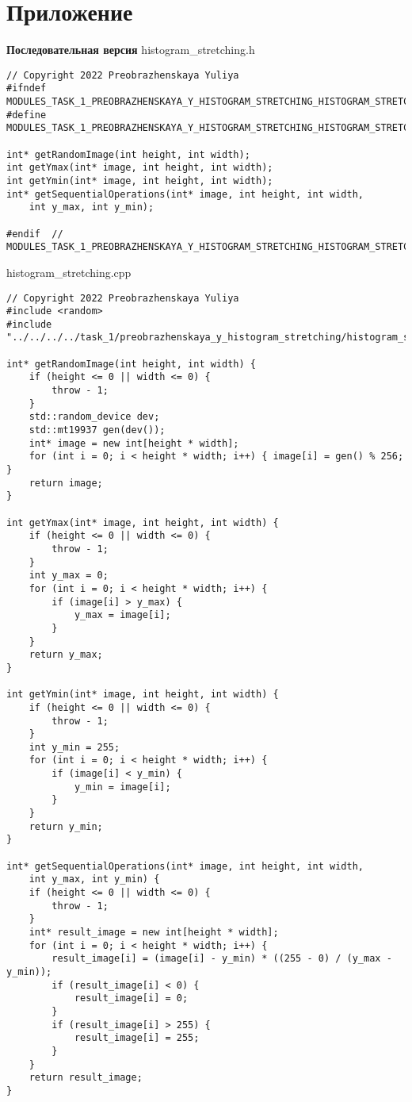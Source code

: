 \documentclass{report}
\begin{document}
\section*{Приложение}
\textbf{Последовательная версия}
\newline
\newline histogram\_stretching.h
\begin{lstlisting}
// Copyright 2022 Preobrazhenskaya Yuliya
#ifndef MODULES_TASK_1_PREOBRAZHENSKAYA_Y_HISTOGRAM_STRETCHING_HISTOGRAM_STRETCHING_H_
#define MODULES_TASK_1_PREOBRAZHENSKAYA_Y_HISTOGRAM_STRETCHING_HISTOGRAM_STRETCHING_H_

int* getRandomImage(int height, int width);
int getYmax(int* image, int height, int width);
int getYmin(int* image, int height, int width);
int* getSequentialOperations(int* image, int height, int width,
    int y_max, int y_min);

#endif  // MODULES_TASK_1_PREOBRAZHENSKAYA_Y_HISTOGRAM_STRETCHING_HISTOGRAM_STRETCHING_H_

\end{lstlisting}
histogram\_stretching.cpp
\begin{lstlisting}
// Copyright 2022 Preobrazhenskaya Yuliya
#include <random>
#include "../../../../task_1/preobrazhenskaya_y_histogram_stretching/histogram_stretching.h"

int* getRandomImage(int height, int width) {
    if (height <= 0 || width <= 0) {
        throw - 1;
    }
    std::random_device dev;
    std::mt19937 gen(dev());
    int* image = new int[height * width];
    for (int i = 0; i < height * width; i++) { image[i] = gen() % 256; }
    return image;
}

int getYmax(int* image, int height, int width) {
    if (height <= 0 || width <= 0) {
        throw - 1;
    }
    int y_max = 0;
    for (int i = 0; i < height * width; i++) {
        if (image[i] > y_max) {
            y_max = image[i];
        }
    }
    return y_max;
}

int getYmin(int* image, int height, int width) {
    if (height <= 0 || width <= 0) {
        throw - 1;
    }
    int y_min = 255;
    for (int i = 0; i < height * width; i++) {
        if (image[i] < y_min) {
            y_min = image[i];
        }
    }
    return y_min;
}

int* getSequentialOperations(int* image, int height, int width,
    int y_max, int y_min) {
    if (height <= 0 || width <= 0) {
        throw - 1;
    }
    int* result_image = new int[height * width];
    for (int i = 0; i < height * width; i++) {
        result_image[i] = (image[i] - y_min) * ((255 - 0) / (y_max - y_min));
        if (result_image[i] < 0) {
            result_image[i] = 0;
        }
        if (result_image[i] > 255) {
            result_image[i] = 255;
        }
    }
    return result_image;
}
\end{lstlisting}
\end{document}
